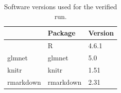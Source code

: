 \begin{table}

\caption{\label{tab:reproducibility-versions}Software versions used for the verified run.}
\centering
\begin{tabular}[t]{lll}
\toprule
  & Package & Version\\
\midrule
 & R & 4.6.1\\
glmnet & glmnet & 5.0\\
knitr & knitr & 1.51\\
rmarkdown & rmarkdown & 2.31\\
\bottomrule
\end{tabular}
\end{table}
